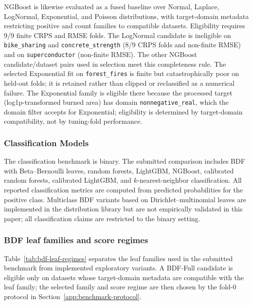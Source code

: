 NGBoost is likewise evaluated as a fused baseline over Normal, Laplace, LogNormal, Exponential, and Poisson distributions, with target-domain metadata restricting positive and count families to compatible datasets. Eligibility requires 9/9 finite CRPS and RMSE folds. The LogNormal candidate is ineligible on \texttt{bike\_sharing} and \texttt{concrete\_strength} (8/9 CRPS folds and non-finite RMSE) and on \texttt{superconductor} (non-finite RMSE). The other NGBoost candidate/dataset pairs used in selection meet this completeness rule. The selected Exponential fit on \texttt{forest\_fires} is finite but catastrophically poor on held-out folds; it is retained rather than clipped or reclassified as a numerical failure. The Exponential family is eligible there because the processed target (log1p-transformed burned area) has domain \texttt{nonnegative\_real}, which the domain filter accepts for Exponential; eligibility is determined by target-domain compatibility, not by tuning-fold performance.

\subsubsection{Classification Models}\label{app:experimental-setup-clas-models}
The classification benchmark is binary. The submitted comparison includes BDF with Beta--Bernoulli leaves, random forests, LightGBM, NGBoost, calibrated random forests, calibrated LightGBM, and $k$-nearest-neighbor classification. All reported classification metrics are computed from predicted probabilities for the positive class. Multiclass BDF variants based on Dirichlet--multinomial leaves are implemented in the distribution library but are not empirically validated in this paper; all classification claims are restricted to the binary setting.

\subsubsection{BDF leaf families and score regimes}\label{app:bdf-leaf-regimes}
Table~\ref{tab:bdf-leaf-regimes} separates the leaf families used in the submitted benchmark from implemented exploratory variants. A BDF-Full candidate is eligible only on datasets whose target-domain metadata are compatible with the leaf family; the selected family and score regime are then chosen by the fold-0 protocol in Section~\ref{app:benchmark-protocol}.

